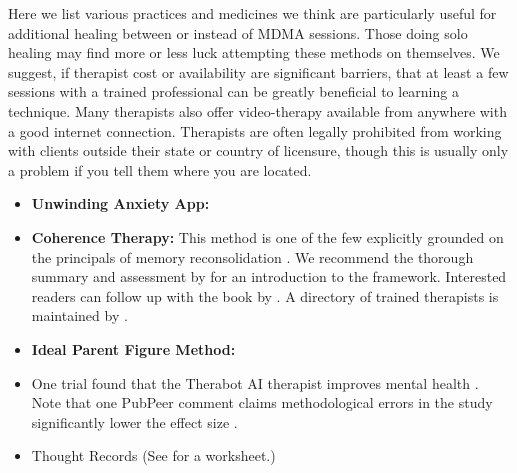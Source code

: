 \documentclass[12pt,letterpaper]{book}
\begin{document}
Here we list various practices and medicines we think are particularly useful for additional healing between or instead of MDMA sessions. Those doing solo healing may find more or less luck attempting these methods on themselves. We suggest, if therapist cost or availability are significant barriers, that at least a few sessions with a trained professional can be greatly beneficial to learning a technique. Many therapists also offer video-therapy available from anywhere with a good internet connection. Therapists are often legally prohibited from working with clients outside their state or country of licensure, though this is usually only a problem if you tell them where you are located.
\begin{itemize}
	\item \textbf{Unwinding Anxiety App:}
 	\item \textbf{Coherence Therapy:} This method is one of the few explicitly grounded on the principals of memory reconsolidation \cite{eckerUnlocking}. We recommend the thorough summary and assessment by \textcite{lesswrongCoherenceTherapy} for an introduction to the framework. Interested readers can follow up with the book by \textcite{eckerUnlocking}. A directory of trained therapists is maintained by \textcite{coherenceDirectory}.
	\label{def:ipf}
    \item \textbf{Ideal Parent Figure Method:}
	\item One trial found that the Therabot AI therapist improves mental health \cite{llmTherapist}. Note that one PubPeer comment claims methodological errors in the study significantly lower the effect size \cite{pubpeertherabot}.
	\item Thought Records (See \textcite{harperThought} for a worksheet.)
\end{itemize}
\end{document}
